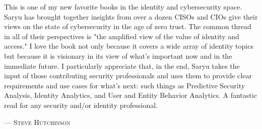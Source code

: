 This is one of my new favorite books in the identity and cybersecurity space. Saryu has brought together insights from over a dozen CISOs and CIOs give their views on the state of cybersecurity in the age of zero trust. The common thread in all of their perspectives is "the amplified view of the value of identity and access." I love the book not only because it covers a wide array of identity topics but because it is visionary in its view of what's important now and in the immediate future. I particularly appreciate that, in the end, Saryu takes the input of those contributing security professionals and uses them to provide clear requirements and use cases for what's next: such things as Predictive Security Analysis, Identity Analytics, and User and Entity Behavior Analytics. A fantastic read for any security and/or identity professional. 
\setlength{\parindent}{0cm}\par\textsc{ --- Steve Hutchinson }\par\vspace{12pt}\setlength{\parindent}{15pt}
